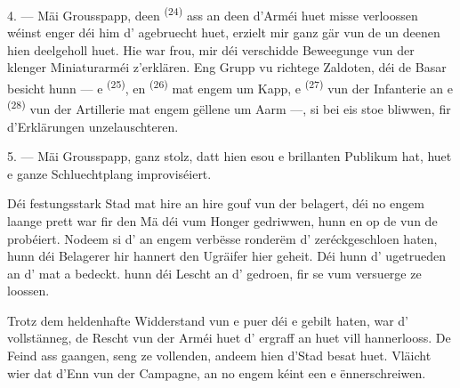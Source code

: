 \VUsaut{4.0mm}
\VUsaut{2.8mm}

4. --- Mäi Grousspapp, deen  \textsuperscript{(24)} ass an deen
d'Arméi huet misse verloossen wéinst enger  déi him
d' agebruecht huet, erzielt mir ganz gär vun de
 un deenen hien deelgeholl huet. Hie war frou, mir déi
verschidde Beweegunge vun der klenger Miniaturarméi z'erklären. Eng Grupp vu
richtege Zaldoten, déi de Basar besicht hunn --- e 
\textsuperscript{(25)}, en  \textsuperscript{(26)} mat engem
 um Kapp, e  \textsuperscript{(27)} vun der
Infanterie an e  \textsuperscript{(28)} vun der Artillerie
mat engem gëllene  um Aarm ---, si bei eis stoe bliwwen, fir
d'Erklärungen unzelauschteren.

5. --- Mäi Grousspapp, ganz stolz, datt hien esou e brillanten Publikum hat, huet e
ganze Schluechtplang improviséiert.

Déi festungsstark Stad mat hire  an hire  gouf vun der
 belagert, déi no engem laange  prett
war fir den  Mä déi  vum Honger gedriwwen, hunn en
 op de  vun de  probéiert. Nodeem si
d' an engem verbësse  ronderëm d'
zeréckgeschloen haten, hunn déi  Belagerer hir 
hannert den  Ugräifer hier geheit. Déi hunn d'
ugetrueden an d' mat  a 
bedeckt.  hunn déi Lescht an d' gedroen, fir
se vum  versuerge ze loossen.

Trotz dem heldenhafte Widderstand vun e puer  déi e
 gebilt haten, war d' vollstänneg, de Rescht vun der
Arméi huet d' ergraff an huet vill  hannerlooss. De
Feind ass gaangen, seng  ze vollenden, andeem hien d'Stad besat huet.
Vläicht wier dat d'Enn vun der Campagne, an no engem  kéint
een e  ënnerschreiwen.

\VUsaut{4.4mm}
\VUsaut{2.8mm}

